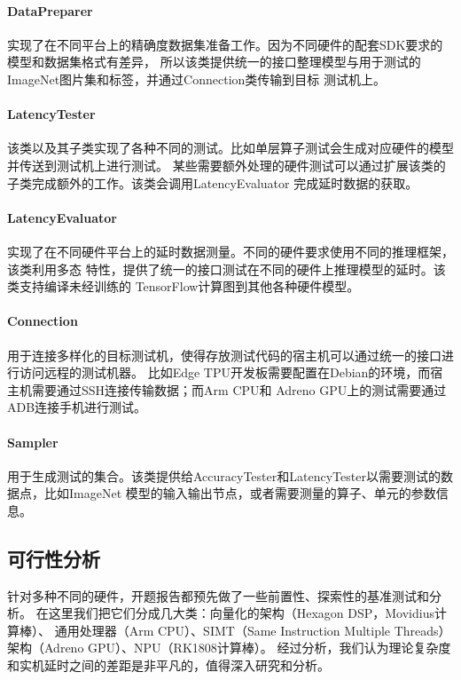 \paragraph{DataPreparer}
实现了在不同平台上的精确度数据集准备工作。因为不同硬件的配套SDK要求的模型和数据集格式有差异，
所以该类提供统一的接口整理模型与用于测试的ImageNet图片集和标签，并通过Connection类传输到目标
测试机上。

\paragraph{LatencyTester}
该类以及其子类实现了各种不同的测试。比如单层算子测试会生成对应硬件的模型并传送到测试机上进行测试。
某些需要额外处理的硬件测试可以通过扩展该类的子类完成额外的工作。该类会调用LatencyEvaluator
完成延时数据的获取。

\paragraph{LatencyEvaluator}
实现了在不同硬件平台上的延时数据测量。不同的硬件要求使用不同的推理框架，该类利用多态
特性，提供了统一的接口测试在不同的硬件上推理模型的延时。该类支持编译未经训练的
TensorFlow计算图到其他各种硬件模型。

\paragraph{Connection}
用于连接多样化的目标测试机，使得存放测试代码的宿主机可以通过统一的接口进行访问远程的测试机器。
比如Edge TPU开发板需要配置在Debian的环境，而宿主机需要通过SSH连接传输数据；而Arm CPU和
Adreno GPU上的测试需要通过ADB连接手机进行测试。

\paragraph{Sampler}
用于生成测试的集合。该类提供给AccuracyTester和LatencyTester以需要测试的数据点，比如ImageNet
模型的输入输出节点，或者需要测量的算子、单元的参数信息。

\subsection{可行性分析}
针对多种不同的硬件，开题报告都预先做了一些前置性、探索性的基准测试和分析。
在这里我们把它们分成几大类：向量化的架构（Hexagon DSP，Movidius计算棒）、
通用处理器（Arm CPU）、SIMT（Same Instruction Multiple Threads）架构（Adreno GPU）、NPU（RK1808计算棒）。
经过分析，我们认为理论复杂度和实机延时之间的差距是非平凡的，值得深入研究和分析。

